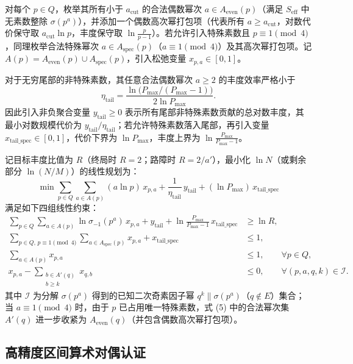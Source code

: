 \documentclass[11pt, a4paper]{article}
\begin{document}
对每个 $p \in Q$，枚举其所有小于 $a_{\mathrm{cut}}$ 的合法偶数幂次 $a \in A_{\mathrm{even}}(p)$（满足 $S_{\mathrm{eff}}$ 中无素数整除 $\sigma(p^a)$），并添加一个偶数高次幂打包项（代表所有 $a \ge a_{\mathrm{cut}}$，对数代价保守取 $a_{\mathrm{cut}}\ln p$，丰度保守取 $\ln\frac{p}{p-1}$）。若允许引入特殊素数且 $p \equiv 1 \pmod{4}$，同理枚举合法特殊幂次 $a \in A_{\mathrm{spec}}(p)$（$a \equiv 1 \pmod{4}$）及其高次幂打包项。记 $A(p) = A_{\mathrm{even}}(p) \cup A_{\mathrm{spec}}(p)$，引入松弛变量 $x_{p,a} \in [0, 1]$。

对于无穷尾部的非特殊素数，其任意合法偶数幂次 $a \ge 2$ 的丰度效率严格小于
\[
\eta_{\mathrm{tail}} = \frac{\ln\bigl(P_{\max}/(P_{\max}-1)\bigr)}{2\ln P_{\max}}.
\]
因此引入非负聚合变量 $y_{\mathrm{tail}} \ge 0$ 表示所有尾部非特殊素数贡献的总对数丰度，其最小对数规模代价为 $y_{\mathrm{tail}} / \eta_{\mathrm{tail}}$；若允许特殊素数落入尾部，再引入变量 $x_{\mathrm{tail\_spec}} \in [0, 1]$，代价下界为 $\ln P_{\max}$，丰度上界为 $\ln\frac{P_{\max}}{P_{\max}-1}$。

记目标丰度比值为 $R$（终局时 $R = 2$；路障时 $R = 2/a'$），最小化 $\ln N$（或剩余部分 $\ln(N/M)$）的线性规划为：
\begin{equation}
\min \sum_{p \in Q}\sum_{a \in A(p)} (a\ln p)\, x_{p,a} + \frac{1}{\eta_{\mathrm{tail}}}\, y_{\mathrm{tail}} + (\ln P_{\max})\, x_{\mathrm{tail\_spec}}
\end{equation}
满足如下四组线性约束：
\begin{align}
\sum_{p \in Q}\sum_{a \in A(p)} \ln\sigma_{-1}(p^a)\, x_{p,a} + y_{\mathrm{tail}} + \ln\frac{P_{\max}}{P_{\max}-1}\, x_{\mathrm{tail\_spec}} &\ge \ln R, \\
\sum_{p \in Q,\, p \equiv 1 \pmod{4}} \sum_{a \in A_{\mathrm{spec}}(p)} x_{p,a} + x_{\mathrm{tail\_spec}} &\le 1, \\
\sum_{a \in A(p)} x_{p,a} &\le 1, \qquad \forall p \in Q, \\
x_{p,a} - \sum_{\substack{b \in A'(q) \\ b \ge k}} x_{q,b} &\le 0, \qquad \forall (p,a,q,k) \in \mathcal{I}.
\end{align}
其中 $\mathcal{I}$ 为分解 $\sigma(p^a)$ 得到的已知二次奇素因子幂 $q^k \parallel \sigma(p^a)$（$q \notin E$）集合；当 $a \equiv 1 \pmod{4}$ 时，由于 $p$ 已占用唯一特殊素数，式 (5) 中的合法幂次集 $A'(q)$ 进一步收紧为 $A_{\mathrm{even}}(q)$（并包含偶数高次幂打包项）。

\subsection{高精度区间算术对偶认证}
\end{document}
